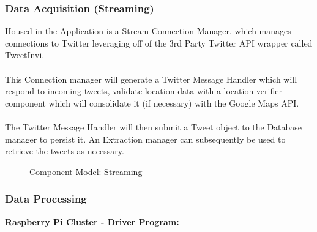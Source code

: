 \documentclass[12pt]{article} %
\begin{document}
	\subsubsection{Data Acquisition (Streaming)}
	
	Housed in the Application is a Stream Connection Manager, which manages connections to Twitter leveraging off of the 3rd Party Twitter API wrapper called TweetInvi.\\
	\
	\\
	This Connection manager will generate a Twitter Message Handler which will respond to incoming tweets, validate location data with a location verifier component which will consolidate it (if necessary) with the Google Maps API. \\
	\
	\\
	The Twitter Message Handler will then submit a Tweet object to the Database manager to persist it. An Extraction manager can subsequently be used to retrieve the tweets as necessary.
	
		\begin{figure}[H] %
			\caption{Component Model: Streaming}
			\label{fig:speciation}
		\end{figure}
	
	\subsubsection{Data Processing}
	
	
	\textbf{Raspberry Pi Cluster - Driver Program:}
	
\end{document}
